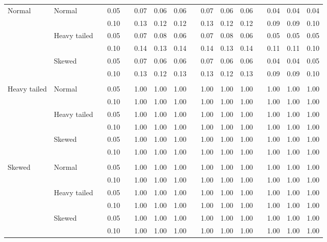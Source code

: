 \begin{table}[ht]
\begin{scriptsize}
\begin{tabular}{ll p{.1cm} c p{.1cm} rrr p{.1cm} rrr p{.1cm} rrr}
\rowcolor{gray!20} Normal       & Normal       && 0.05 && 0.07 & 0.06 & 0.06 && 0.07 & 0.06 & 0.06 && 0.04 & 0.04 & 0.04 \\ 
\rowcolor{gray!20}             &              && 0.10 && 0.13 & 0.12 & 0.12 && 0.13 & 0.12 & 0.12 && 0.09 & 0.09 & 0.10 \\ 
\rowcolor{gray!20}             & Heavy tailed && 0.05 && 0.07 & 0.08 & 0.06 && 0.07 & 0.08 & 0.06 && 0.05 & 0.05 & 0.05 \\ 
\rowcolor{gray!20}             &              && 0.10 && 0.14 & 0.13 & 0.14 && 0.14 & 0.13 & 0.14 && 0.11 & 0.11 & 0.10 \\ 
\rowcolor{gray!20}             & Skewed       && 0.05 && 0.07 & 0.06 & 0.06 && 0.07 & 0.06 & 0.06 && 0.04 & 0.04 & 0.05 \\ 
\rowcolor{gray!20}             &              && 0.10 && 0.13 & 0.12 & 0.13 && 0.13 & 0.12 & 0.13 && 0.09 & 0.09 & 0.10 \\ 
             &&&&&&&&&&&&&&&\\
Heavy tailed & Normal       && 0.05 && 1.00 & 1.00 & 1.00 && 1.00 & 1.00 & 1.00 && 1.00 & 1.00 & 1.00 \\ 
             &              && 0.10 && 1.00 & 1.00 & 1.00 && 1.00 & 1.00 & 1.00 && 1.00 & 1.00 & 1.00 \\ 
             & Heavy tailed && 0.05 && 1.00 & 1.00 & 1.00 && 1.00 & 1.00 & 1.00 && 1.00 & 1.00 & 1.00 \\ 
             &              && 0.10 && 1.00 & 1.00 & 1.00 && 1.00 & 1.00 & 1.00 && 1.00 & 1.00 & 1.00 \\ 
             & Skewed       && 0.05 && 1.00 & 1.00 & 1.00 && 1.00 & 1.00 & 1.00 && 1.00 & 1.00 & 1.00 \\ 
             &              && 0.10 && 1.00 & 1.00 & 1.00 && 1.00 & 1.00 & 1.00 && 1.00 & 1.00 & 1.00 \\ 
             &&&&&&&&&&&&&&&\\
Skewed       & Normal       && 0.05 && 1.00 & 1.00 & 1.00 && 1.00 & 1.00 & 1.00 && 1.00 & 1.00 & 1.00 \\ 
             &              && 0.10 && 1.00 & 1.00 & 1.00 && 1.00 & 1.00 & 1.00 && 1.00 & 1.00 & 1.00 \\ 
             & Heavy tailed && 0.05 && 1.00 & 1.00 & 1.00 && 1.00 & 1.00 & 1.00 && 1.00 & 1.00 & 1.00 \\ 
             &              && 0.10 && 1.00 & 1.00 & 1.00 && 1.00 & 1.00 & 1.00 && 1.00 & 1.00 & 1.00 \\ 
             & Skewed       && 0.05 && 1.00 & 1.00 & 1.00 && 1.00 & 1.00 & 1.00 && 1.00 & 1.00 & 1.00 \\ 
             &              && 0.10 && 1.00 & 1.00 & 1.00 && 1.00 & 1.00 & 1.00 && 1.00 & 1.00 & 1.00 \\ 


\end{tabular}
\end{scriptsize}
\end{table}
